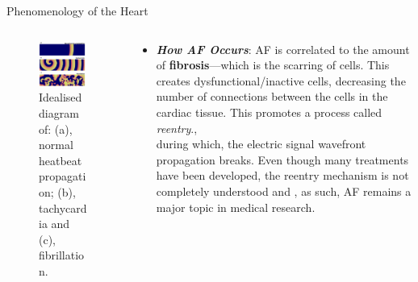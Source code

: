 \documentclass[final,hyperref={pdfpagelabels=false}]{beamer}
\begin{document}
\begin{frame}[t]
\begin{columns}[t]
\begin{column}{.465\textwidth}
\begin{block}{Phenomenology of the Heart}
\begin{itemize}
\end{itemize}

\begin{columns}
\begin{column}{.43\textwidth}
\begin{figure}
	\includegraphics[width=0.95\textwidth]{spiralbreak2tachy}
	\caption{\label{fig:frog1}Idealised diagram of: (a), normal heatbeat propagation; (b), tachycardia and (c), fibrillation. }
	\end{figure}


\end{column}
\begin{column}{.54\textwidth}
\begin{itemize}
	\item \textbf{\textit{How AF Occurs}}: AF is correlated to the amount of \textbf{ fibrosis}---which is the scarring of cells. This creates dysfunctional/inactive cells, decreasing the number of connections between the cells in the cardiac tissue. This promotes a process called \textit{ reentry}.,\\
	during which, the electric signal wavefront propagation breaks. 
	Even though many treatments have been developed, the reentry mechanism is not completely understood and , as such, AF remains a major topic in medical research. \\
	\end{itemize}


\end{column}
\end{columns}
\end{block}
\end{column}
\end{columns}
\end{frame}
\end{document}
